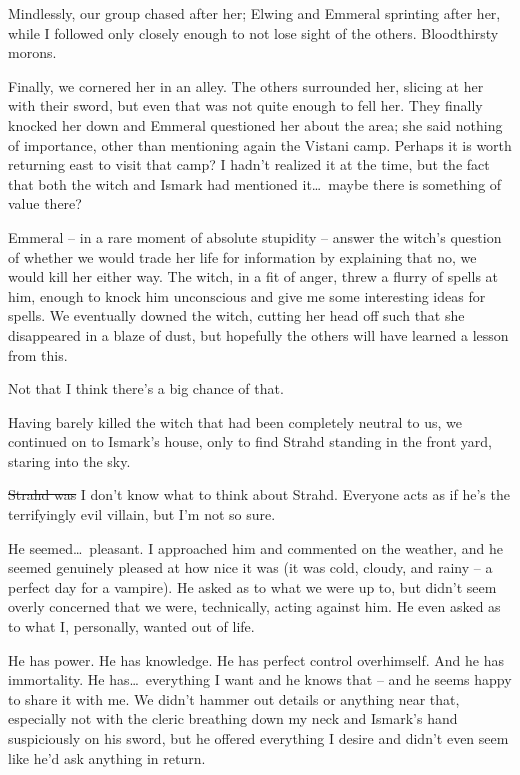 Mindlessly, our group chased after her; Elwing and Emmeral sprinting after her, while I followed only closely enough to not lose sight of the others. Bloodthirsty morons.

Finally, we cornered her in an alley. The others surrounded her, slicing at her with their sword, but even that was not quite enough to fell her. They finally knocked her down and Emmeral questioned her about the area; she said nothing of importance, other than mentioning again the Vistani camp. Perhaps it is worth returning east to visit that camp? I hadn't realized it at the time, but the fact that both the witch and Ismark had mentioned it\dots\ maybe there is something of value there?

Emmeral -- in a rare moment of absolute stupidity -- answer the witch's question of whether we would trade her life for information by explaining that no, we would kill her either way. The witch, in a fit of anger, threw a flurry of spells at him, enough to knock him unconscious and give me some interesting ideas for spells. We eventually downed the witch, cutting her head off such that she disappeared in a blaze of dust, but hopefully the others will have learned a lesson from this.

Not that I think there's a big chance of that.

Having barely killed the witch that had been completely neutral to us, we continued on to Ismark's house, only to find Strahd standing in the front yard, staring into the sky.

\st{Strahd was} I don't know what to think about Strahd. Everyone acts as if he's the terrifyingly evil villain, but I'm not so sure.

He seemed\dots\ pleasant. I approached him and commented on the weather, and he seemed genuinely pleased at how nice it was (it was cold, cloudy, and rainy -- a perfect day for a vampire). He asked as to what we were up to, but didn't seem overly concerned that we were, technically, acting against him. He even asked as to what I, personally, wanted out of life.

He has power. He has knowledge. He has perfect control overhimself. And he has immortality. He has\dots\ everything I want and he knows that -- and he seems happy to share it with me. We didn't hammer out details or anything near that, especially not with the cleric breathing down my neck and Ismark's hand suspiciously on his sword, but he offered everything I desire and didn't even seem like he'd ask anything in return.

